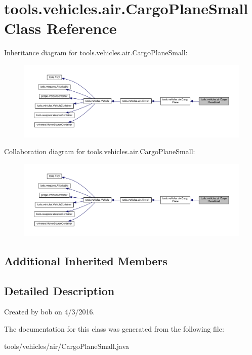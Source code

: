 \hypertarget{classtools_1_1vehicles_1_1air_1_1_cargo_plane_small}{}\section{tools.\+vehicles.\+air.\+Cargo\+Plane\+Small Class Reference}
\label{classtools_1_1vehicles_1_1air_1_1_cargo_plane_small}


Inheritance diagram for tools.\+vehicles.\+air.\+Cargo\+Plane\+Small\+:\nopagebreak
\begin{figure}[H]
\begin{center}
\leavevmode
\includegraphics[width=350pt]{classtools_1_1vehicles_1_1air_1_1_cargo_plane_small__inherit__graph}
\end{center}
\end{figure}


Collaboration diagram for tools.\+vehicles.\+air.\+Cargo\+Plane\+Small\+:\nopagebreak
\begin{figure}[H]
\begin{center}
\leavevmode
\includegraphics[width=350pt]{classtools_1_1vehicles_1_1air_1_1_cargo_plane_small__coll__graph}
\end{center}
\end{figure}
\subsection*{Additional Inherited Members}


\subsection{Detailed Description}
Created by bob on 4/3/2016. 

The documentation for this class was generated from the following file\+:\begin{DoxyCompactItemize}
\item 
tools/vehicles/air/Cargo\+Plane\+Small.\+java\end{DoxyCompactItemize}
